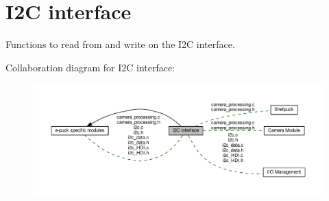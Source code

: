 \hypertarget{group__i2c}{}\section{I2\+C interface}
\label{group__i2c}


Functions to read from and write on the I2\+C interface.  


Collaboration diagram for I2\+C interface\+:\nopagebreak
\begin{figure}[H]
\begin{center}
\leavevmode
\includegraphics[width=350pt]{d3/df5/group__i2c}
\end{center}
\end{figure}
